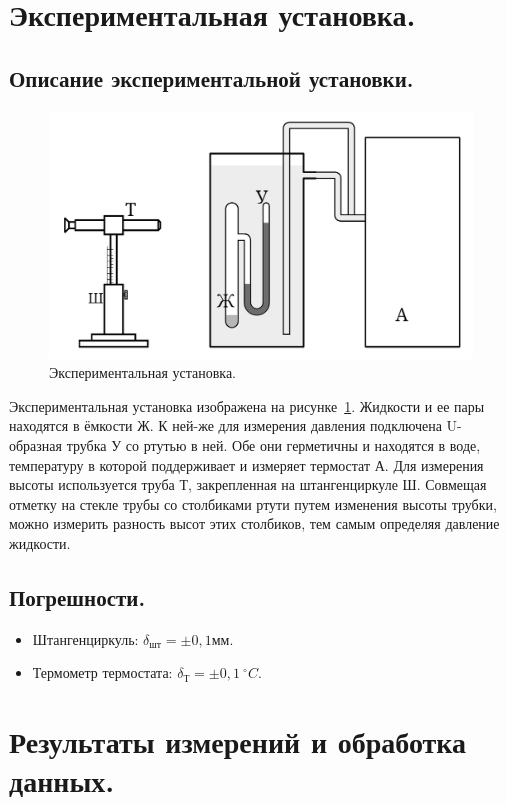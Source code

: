 \documentclass[a4paper,11pt]{article}
\begin{document}
\section{Экспериментальная установка.}
\subsection{Описание экспериментальной установки.}
\begin{figure}
  \includegraphics[scale = 0.19]{scheme.png}
  \caption{Экспериментальная установка.}
  \label{fig:img1}
\end{figure}
Экспериментальная установка изображена на рисунке~\ref{fig:img1}. Жидкости и ее пары находятся в ёмкости Ж. К ней-же для измерения давления подключена U-образная трубка У со ртутью в ней. Обе они герметичны и находятся в воде, температуру в которой поддерживает и измеряет термостат А. Для измерения высоты используется труба Т, закрепленная на штангенциркуле Ш. Совмещая отметку на стекле трубы со столбиками ртути путем изменения высоты трубки, можно измерить разность высот этих столбиков, тем самым определяя давление жидкости.
\subsection{Погрешности.}
\begin{itemize}
  \item Штангенциркуль: $\delta_{шт} = \pm 0,1 мм$.
  \item Термометр термостата: $\delta_{Т} = \pm 0,1\ ^{\circ}C$.
\end{itemize}
\section{Результаты измерений и обработка данных.}
\end{document}
